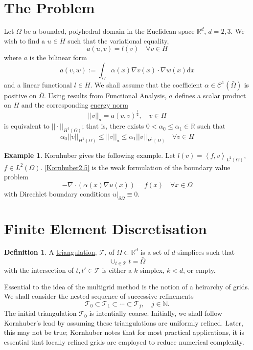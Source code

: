 \documentclass[a4paper,10pt,oneside]{book}
\theoremstyle{plain}%
\theoremstyle{definition}
\newtheorem{defn}{Definition}[section]
\newtheorem{example}{Example}[section]
\theoremstyle{remark}
\newcommand{\bbR}{\mathbb{R}}
\newcommand{\bbN}{\mathbb{N}}
\newcommand{\calC}{\mathcal{C}}
\newcommand{\calT}{\mathcal{T}}
\newcommand{\rmd}{\mathrm{d}}
\newcommand{\dx}{\rmd x}
\begin{document}
\section{The Problem}
Let $\Omega$ be a bounded, polyhedral domain in the Euclidean space $\bbR^d$,
$d=2,3$. We wish to find a $u\in H$ such that the variational equality,
\begin{equation}
 a(u,v)=l(v)\quad\forall v\in H
\end{equation}
where $a$ is the bilinear form
\begin{equation}\label{Kornhuber2.5}
 a(v,w):=\int_\Omega\alpha(x)\nabla v(x)\cdot\nabla w(x)\dx
\end{equation}
and a linear functional $l\in H$. We shall assume that the coefficient
$\alpha\in \calC^1(\bar{\Omega})$ is positive on $\bar{\Omega}$. Using results
from Functional Analysis, $a$ defines a scalar product on $H$ and the
corresponding \underline{energy norm}
\begin{equation}
 ||v||_a = a(v,v)^{\frac{1}{2}},\quad v\in H
\end{equation}
is equivalent to $||\cdot||_{H^1(\Omega)}$; that is, there exists
$0<\alpha_0\leq\alpha_1\in\bbR$ such that
\begin{equation}
 \alpha_0||v||_{H^1(\Omega)}\leq
||v||_a\leq\alpha_1||v||_{H^1(\Omega)}\quad\forall v\in H
\end{equation}

\begin{example}
 Kornhuber \cite{Kornhuber08} gives the following example. Let
$l(v)=\left<f,v\right>_{L^2(\Omega)}$, $f\in L^2(\Omega)$. \eqref{Kornhuber2.5}
is the weak
formulation of the boundary value problem
\begin{equation}
 -\nabla\cdot(\alpha(x)\nabla u(x))=f(x)\quad\forall x\in\Omega
\end{equation}
with Direchlet boundary conditions $u|_{\partial\Omega}\equiv0$.
\end{example}

\section{Finite Element Discretisation}
\begin{defn}
 A \underline{triangulation}, $\calT$, of $\Omega\subset\bbR^d$ is a set of
$d$-simplices such that
 \begin{equation}
  \cup_{t\in\calT}t=\bar{\Omega}
 \end{equation}
with the intersection of $t,t'\in\calT$ is either a $k$ simplex, $k<d$, or
empty.
\end{defn}
Essential to the idea of the multigrid method is the notion of a heirarchy of
grids. We shall consider the nested sequence of successive refinements
  \begin{equation*}
    \calT_0\subset\calT_1\subset\cdots\subset\calT_j,\quad j\in\bbN.
  \end{equation*}
The initial triangulation $\calT_0$ is intentially coarse. Initially, we shall
follow Kornhuber's lead by assuming these triangulations are uniformly refined.
Later, this may not be true; Kornhuber notes that for most practical
applications, it is essential that locally refined grids are employed to reduce
numerical complexity.
\end{document}
